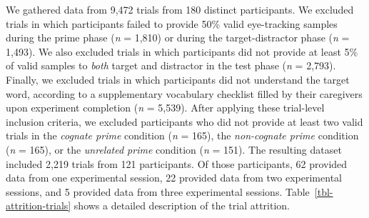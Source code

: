 \documentclass[
  letterpaper,
  DIV=11,
  numbers=noendperiod]{scrartcl}
\begin{document}
We gathered data from 9,472 trials from 180 distinct participants. We
excluded trials in which participants failed to provide 50\% valid
eye-tracking samples during the prime phase (\emph{n} = 1,810) or during
the target-distractor phase (\emph{n} = 1,493). We also excluded trials
in which participants did not provide at least 5\% of valid samples to
\emph{both} target and distractor in the test phase (\emph{n} = 2,793).
Finally, we excluded trials in which participants did not understand the
target word, according to a supplementary vocabulary checklist filled by
their caregivers upon experiment completion (\emph{n} = 5,539). After
applying these trial-level inclusion criteria, we excluded participants
who did not provide at least two valid trials in the \emph{cognate
prime} condition (\emph{n} = 165), the \emph{non-cognate prime}
condition (\emph{n} = 165), or the \emph{unrelated prime} condition
(\emph{n} = 151). The resulting dataset included 2,219 trials from 121
participants. Of those participants, 62 provided data from one
experimental session, 22 provided data from two experimental sessions,
and 5 provided data from three experimental sessions.
Table~\ref{tbl-attrition-trials} shows a detailed description of the
trial attrition.
\end{document}

